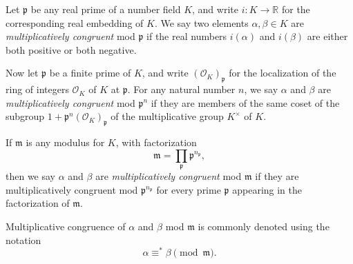 \documentclass[12pt]{article}
\newcommand{\p}{{\mathfrak{p}}}
\newcommand{\m}{{\mathfrak{m}}}
\newcommand{\R}{\mathbb{R}}
\renewcommand{\O}{\mathcal{O}}
\newcommand{\lra}{\longrightarrow}
\begin{document}
Let $\p$ be any real prime of a number field $K$, and write $i: K \lra \R$ for the corresponding real embedding of $K$. We say two elements $\alpha, \beta \in K$ are {\em multiplicatively congruent} mod $\p$ if the real numbers $i(\alpha)$ and $i(\beta)$ are either both positive or both negative.

Now let $\p$ be a finite prime of $K$, and write $(\O_K)_\p$ for the localization of the ring of integers $\O_K$ of $K$ at $\p$. For any natural number $n$, we say $\alpha$ and $\beta$ are {\em multiplicatively congruent} mod $\p^n$ if they are members of the same coset of the subgroup $1+\p^n(\O_K)_\p$ of the multiplicative group $K^\times$ of $K$.

If $\m$ is any modulus for $K$, with factorization
$$
\m = \prod_{\p} \p^{n_\p},
$$
then we say $\alpha$ and $\beta$ are {\em multiplicatively congruent} mod $\m$ if they are multiplicatively congruent mod $\p^{n_\p}$ for every prime $\p$ appearing in the factorization of $\m$.

Multiplicative congruence of $\alpha$ and $\beta$ mod $\m$ is commonly denoted using the notation
$$
\alpha \equiv^* \beta \pmod{\m}.
$$
\end{document}
